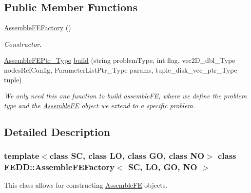 \subsection*{Public Member Functions}
\begin{DoxyCompactItemize}
\item 
\hyperlink{classFEDD_1_1AssembleFEFactory_a29b1ce08865f9d32e7011e208a4cebb9}{Assemble\+F\+E\+Factory} ()
\begin{DoxyCompactList}\small\item\em Constructor. \end{DoxyCompactList}\item 
\hyperlink{classFEDD_1_1AssembleFEFactory_aa7e0143080c2d0fbe8df0d26c55d6b5c}{Assemble\+F\+E\+Ptr\+\_\+\+Type} \hyperlink{classFEDD_1_1AssembleFEFactory_ac895d65acf2626100832586df84d6a9c}{build} (string problem\+Type, int flag, vec2\+D\+\_\+dbl\+\_\+\+Type nodes\+Ref\+Config, Parameter\+List\+Ptr\+\_\+\+Type params, tuple\+\_\+disk\+\_\+vec\+\_\+ptr\+\_\+\+Type tuple)
\begin{DoxyCompactList}\small\item\em We only need this one function to build assemble\+FE, where we define the problem type and the \hyperlink{classFEDD_1_1AssembleFE}{Assemble\+FE} object we extend to a specific problem. \end{DoxyCompactList}\end{DoxyCompactItemize}


\subsection{Detailed Description}
\subsubsection*{template$<$class SC, class LO, class GO, class NO$>$\newline
class F\+E\+D\+D\+::\+Assemble\+F\+E\+Factory$<$ S\+C, L\+O, G\+O, N\+O $>$}

This class allows for constructing \hyperlink{classFEDD_1_1AssembleFE}{Assemble\+FE} objects. 


